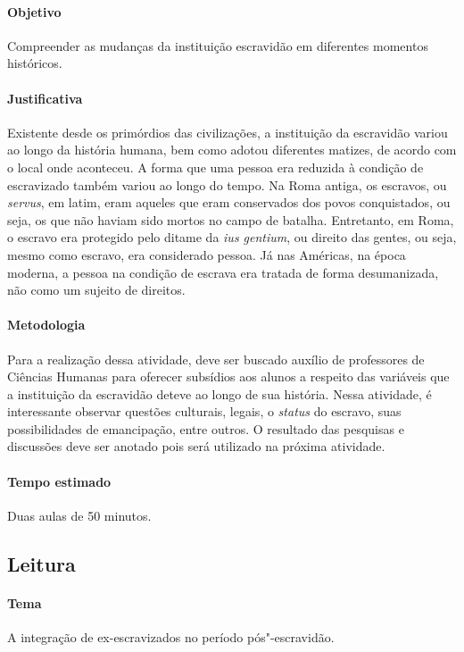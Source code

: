 \documentclass[12pt]{extarticle}
\begin{document}
\paragraph{Objetivo} Compreender as mudanças da instituição
escravidão em diferentes momentos históricos.

\paragraph{Justificativa}  Existente desde os primórdios das civilizações, a instituição
da escravidão variou ao longo da história humana, bem como adotou
diferentes matizes, de acordo com o local onde aconteceu. A forma que
uma pessoa era reduzida à condição de escravizado também variou ao longo
do tempo. Na Roma antiga, os escravos, ou \emph{servus}, em latim, eram
aqueles que eram conservados dos povos conquistados, ou seja, os
que não haviam sido mortos no campo de batalha. Entretanto, em Roma, o
escravo era protegido pelo ditame da \emph{ius gentium}, ou direito das
gentes, ou seja, mesmo como escravo, era considerado pessoa. Já nas
Américas, na época moderna, a pessoa na condição de escrava era tratada 
de forma desumanizada, não como um sujeito de direitos. 

\paragraph{Metodologia} Para a realização dessa atividade, deve ser buscado
auxílio de professores de Ciências Humanas para oferecer subsídios aos alunos a
respeito das variáveis que a instituição da escravidão deteve ao longo
de sua história. Nessa atividade, é interessante observar questões 
culturais, legais, o \emph{status} do escravo, suas possibilidades de
emancipação, entre outros. O resultado das pesquisas e discussões deve
ser anotado pois será utilizado na próxima atividade.

\paragraph{Tempo estimado} Duas aulas de 50 minutos.

\subsection{Leitura}

\paragraph{Tema} A integração de ex-escravizados no período pós"-escravidão.
\end{document}
